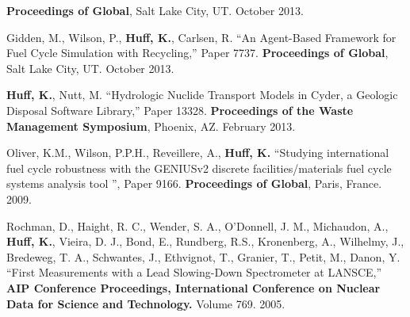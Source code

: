\documentclass[margin,line]{resume}
\begin{document}
\begin{resume}
\begin{bibenum}
         \textbf{Proceedings of Global}, Salt Lake City, UT. October 2013.
      \item Gidden, M., Wilson, P., \textbf{Huff, K.}, Carlsen, R. ``An Agent-Based Framework for Fuel Cycle Simulation with Recycling,'' Paper 7737.
         \textbf{Proceedings of Global}, Salt Lake City, UT. October 2013.
      \item \textbf{Huff, K.}, Nutt, M. ``Hydrologic Nuclide Transport Models in Cyder, a Geologic Disposal Software Library,'' Paper 13328.
         \textbf{Proceedings of the Waste Management Symposium}, Phoenix, AZ.  February 2013.
      \item Oliver, K.M., Wilson, P.P.H., Reveillere, A., \textbf{Huff, K.} ``Studying international fuel cycle robustness with the GENIUSv2 discrete
          facilities/materials fuel cycle systems analysis tool	'', Paper 9166.
          \textbf{Proceedings of Global}, Paris, France. 2009.
      \item Rochman, D., Haight, R. C., Wender, S. A., O'Donnell, J. M.,
        Michaudon, A., \textbf{Huff, K.}, Vieira, D. J., Bond, E., Rundberg, R.S.,
        Kronenberg, A., Wilhelmy, J., Bredeweg, T. A., Schwantes, J., Ethvignot, T.,
        Granier, T., Petit, M., Danon, Y.
        ``First Measurements with a Lead Slowing-Down Spectrometer at LANSCE,''
        \textbf{AIP Conference Proceedings, International Conference on Nuclear
        Data for Science and Technology.} Volume 769. 2005.
    \end{bibenum}

\end{resume}
\end{document}

